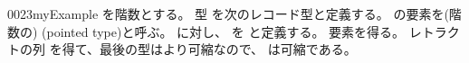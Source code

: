 \documentclass[index]{subfiles}
\begin{document}
\StartDefiningTabulars
\begin{myBlock}{0023}{myExample}
  を階数とする。
  型
  を次のレコード型と定義する。
  の要素を(階数の)
  (pointed type)と呼ぶ。
  に対し、
  を
  と定義する。
  要素を得る。
  レトラクトの列
  を得て、最後の型はより可縮なので、
  は可縮である。
\end{myBlock}
\StopDefiningTabulars
\end{document}
